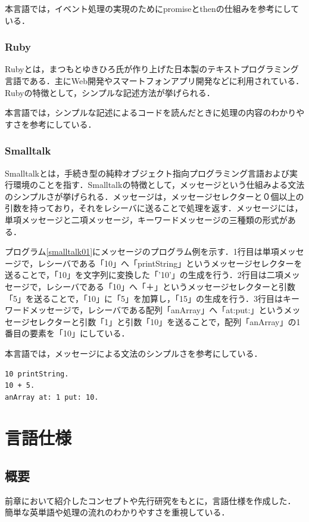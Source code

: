 \documentclass[10pt,a4j]{ltjsarticle}
\begin{document}
本言語では，イベント処理の実現のためにpromiseとthenの仕組みを参考にしている．

\subsubsection{Ruby}
Rubyとは，まつもとゆきひろ氏が作り上げた日本製のテキストプログラミング言語である．主にWeb開発やスマートフォンアプリ開発などに利用されている．Rubyの特徴として，シンプルな記述方法が挙げられる．

本言語では，シンプルな記述によるコードを読んだときに処理の内容のわかりやすさを参考にしている．
\subsubsection{Smalltalk}
Smalltalkとは，手続き型の純粋オブジェクト指向プログラミング言語および実行環境のことを指す．Smalltalkの特徴として，メッセージという仕組みよる文法のシンプルさが挙げられる．メッセージは，メッセージセレクターと０個以上の引数を持っており，それをレシーバに送ることで処理を返す．メッセージには，単項メッセージと二項メッセージ，キーワードメッセージの三種類の形式がある．

プログラム\ref{smalltalk01}にメッセージのプログラム例を示す．1行目は単項メッセージで，レシーバである「10」へ「printString」というメッセージセレクターを送ることで，「10」を文字列に変換した「'10'」の生成を行う．2行目は二項メッセージで，レシーバである「10」へ「＋」というメッセージセレクターと引数「5」を送ることで，「10」に「5」を加算し，「15」の生成を行う．3行目はキーワードメッセージで，レシーバである配列「anArray」へ「at:put:」というメッセージセレクターと引数「1」と引数「10」を送ることで，配列「anArray」の1番目の要素を「10」にしている．

本言語では，メッセージによる文法のシンプルさを参考にしている．

\begin{lstlisting}[caption=メッセージのプログラム例, label=smalltalk01]
10 printString.
10 + 5.
anArray at: 1 put: 10.
\end{lstlisting}
\clearpage

\section{言語仕様}
\subsection{概要}
前章において紹介したコンセプトや先行研究\cite{senkou1,senkou2}をもとに，言語仕様を作成した．
簡単な英単語や処理の流れのわかりやすさを重視している．
\end{document}
